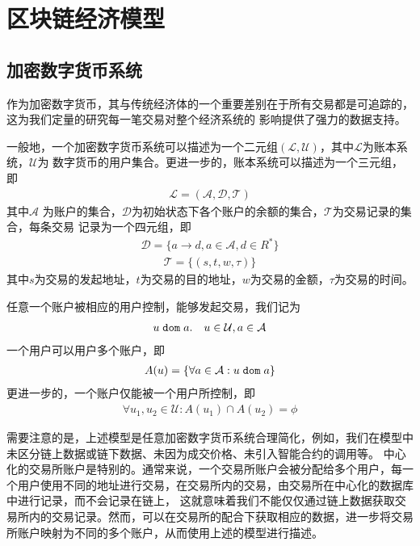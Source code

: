\section{区块链经济模型}


\subsection{加密数字货币系统}
作为加密数字货币，其与传统经济体的一个重要差别在于所有交易都是可追踪的，这为我们定量的研究每一笔交易对整个经济系统的
影响提供了强力的数据支持。

一般地，一个加密数字货币系统可以描述为一个二元组$(\mathcal{L}, \mathcal{U})$，其中$\mathcal{L}$为账本系统，$\mathcal{U}$为
数字货币的用户集合。更进一步的，账本系统可以描述为一个三元组，即
\begin{align}
\mathcal{L} = (\mathcal{A}, \mathcal{D}, \mathcal{T})
\end{align}
\noindent 其中$\mathcal{A}$ 为账户的集合，$\mathcal{D}$为初始状态下各个账户的余额的集合，$\mathcal{T}$为交易记录的集合，每条交易
记录为一个四元组，即
\begin{align}
\mathcal{D} = \{a \rightarrow d, a{\in}\mathcal{A}, d{\in}R^*\}
\end{align}
\begin{align}
\mathcal{T} = \{(s, t, w, \tau)\}
\end{align}
\noindent 其中$s$为交易的发起地址，$t$为交易的目的地址，$w$为交易的金额，$\tau$为交易的时间。

任意一个账户被相应的用户控制，能够发起交易，我们记为
\begin{align}
u {\; \texttt{dom}\;} a. \quad u\in \mathcal{U}, a\in \mathcal{A}
\end{align}
\noindent 一个用户可以用户多个账户，即
\begin{align}
A(u) = \{\forall a\in \mathcal{A} : u {\; \texttt{dom}\;} a\}
\end{align}
\noindent 更进一步的，一个账户仅能被一个用户所控制，即
\begin{align}
\forall u_1, u_2 \in \mathcal{U} : A(u_1) \cap A(u_2) = \phi
\end{align}

需要注意的是，上述模型是任意加密数字货币系统合理简化，例如，我们在模型中未区分链上数据或链下数据、未因为成交价格、未引入智能合约的调用等。
中心化的交易所账户是特别的。通常来说，一个交易所账户会被分配给多个用户，每一个用户使用不同的地址进行交易，在交易所内的交易，由交易所在中心化的数据库中进行记录，而不会记录在链上，
这就意味着我们不能仅仅通过链上数据获取交易所内的交易记录。然而，可以在交易所的配合下获取相应的数据，进一步将交易所账户映射为不同的多个账户，从而使用上述的模型进行描述。



